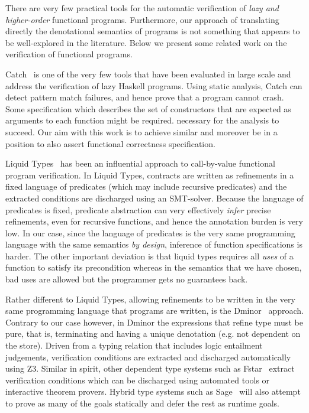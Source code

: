 There are very few practical tools for the automatic
verification of {\em lazy and higher-order} functional programs.
Furthermore, our approach of translating directly the denotational semantics of
programs is not something that appears to be well-explored in the literature.
Below we present some related work on the verification of functional programs.

Catch~\cite{Mitchell:2008:PBE:1411286.1411293} is one of the very few tools that
have been evaluated in large scale and address the verification of lazy Haskell
programs. Using static analysis, Catch can detect pattern match failures, and hence
prove that a program cannot crash. Some specification which describes the set of
constructors that are expected as arguments to each function might be required.
necessary for the analysis to succeed. Our aim with this work is to achieve similar and
moreover be in a position to also assert functional correctness specification.

Liquid Types~\cite{Rondon:2008:LT:1375581.1375602} has been an influential
approach to call-by-value functional program verification. In Liquid Types,
contracts are written as refinements in a fixed language of predicates (which may
include recursive predicates) and the extracted conditions are discharged using an
SMT-solver. Because the language of predicates is fixed, predicate abstraction can
very effectively {\em infer} precise refinements, even for recursive functions, and
hence the annotation burden is very low. In our case, since the language of predicates
is the very same programming language with the same semantics {\em by design}, inference
of function specifications is harder. The other important deviation is that liquid types
requires all {\em uses} of a function to satisfy its precondition whereas in the semantics
that we have chosen, bad uses are allowed but the programmer gets no guarantees back.

Rather different to Liquid Types, allowing refinements to be written
in the very same programming language that programs are written, is the
Dminor~\cite{Bierman+:subtyping} approach. Contrary to our case however, in Dminor
the expressions that refine type must be pure, that is, terminating and having a unique
denotation (e.g. not dependent on the store). Driven from a typing relation that includes
logic entailment judgements, verification conditions are extracted and discharged automatically using Z3.
Similar in spirit, other dependent type systems such
as Fstar~\cite{fstar} extract verification conditions which can be discharged
using automated tools
or interactive theorem provers. Hybrid type systems such as Sage~\cite{Knowles+:sage}
will also attempt to prove as many of the goals statically and defer the rest as runtime
goals.

